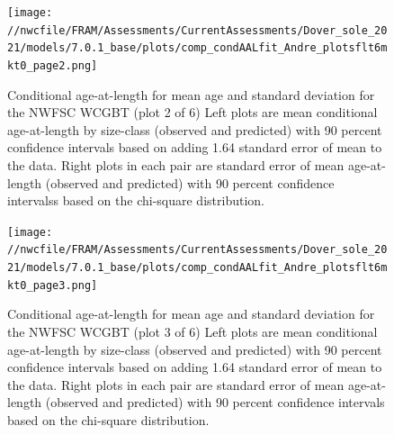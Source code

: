 \documentclass[11pt,
  english,
  a4paper,
]{article}
\begin{document}
\tagmcend\tagstructend


\begin{figure}
\centering
\texttt{[image: //nwcfile/FRAM/Assessments/CurrentAssessments/Dover\_sole\_2021/models/7.0.1\_base/plots/comp\_condAALfit\_Andre\_plotsflt6mkt0\_page2.png]}
\caption{Conditional age-at-length for mean age and standard deviation for the NWFSC WCGBT (plot 2 of 6) Left plots are mean conditional age-at-length by size-class (observed and predicted) with 90 percent confidence intervals based on adding 1.64 standard error of mean to the data. Right plots in each pair are standard error of mean age-at-length (observed and predicted) with 90 percent confidence intervalss based on the chi-square distribution.\label{fig:wcgbt-caal-fit-2}}
\end{figure}

\tagmcend\tagstructend


\begin{figure}
\centering
\texttt{[image: //nwcfile/FRAM/Assessments/CurrentAssessments/Dover\_sole\_2021/models/7.0.1\_base/plots/comp\_condAALfit\_Andre\_plotsflt6mkt0\_page3.png]}
\caption{Conditional age-at-length for mean age and standard deviation for the NWFSC WCGBT (plot 3 of 6) Left plots are mean conditional age-at-length by size-class (observed and predicted) with 90 percent confidence intervals based on adding 1.64 standard error of mean to the data. Right plots in each pair are standard error of mean age-at-length (observed and predicted) with 90 percent confidence intervals based on the chi-square distribution.\label{fig:wcgbt-caal-fit-3}}
\end{figure}
\end{document}
